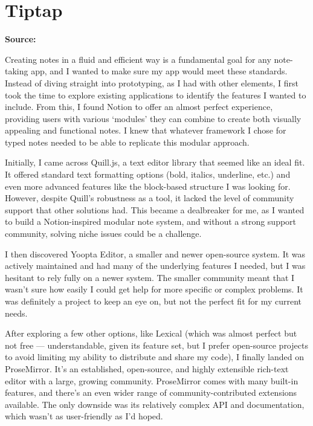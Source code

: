 \section{Tiptap}
\label{research:Tiptap}
\textbf{Source:} \cite{TiptapDocs}

Creating notes in a fluid and efficient way is a fundamental goal for any note-taking app, and I wanted to make sure my app would meet these standards. Instead of diving straight into prototyping, as I had with other elements, I first took the time to explore existing applications to identify the features I wanted to include. From this, I found Notion to offer an almost perfect experience, providing users with various ‘modules’ they can combine to create both visually appealing and functional notes. I knew that whatever framework I chose for typed notes needed to be able to replicate this modular approach.

Initially, I came across Quill.js, a text editor library that seemed like an ideal fit. It offered standard text formatting options (bold, italics, underline, etc.) and even more advanced features like the block-based structure I was looking for. However, despite Quill’s robustness as a tool, it lacked the level of community support that other solutions had. This became a dealbreaker for me, as I wanted to build a Notion-inspired modular note system, and without a strong support community, solving niche issues could be a challenge.

I then discovered Yoopta Editor, a smaller and newer open-source system. It was actively maintained and had many of the underlying features I needed, but I was hesitant to rely fully on a newer system. The smaller community meant that I wasn’t sure how easily I could get help for more specific or complex problems. It was definitely a project to keep an eye on, but not the perfect fit for my current needs.

After exploring a few other options, like Lexical (which was almost perfect but not free — understandable, given its feature set, but I prefer open-source projects to avoid limiting my ability to distribute and share my code), I finally landed on ProseMirror. It’s an established, open-source, and highly extensible rich-text editor with a large, growing community. ProseMirror comes with many built-in features, and there’s an even wider range of community-contributed extensions available. The only downside was its relatively complex API and documentation, which wasn’t as user-friendly as I’d hoped.

